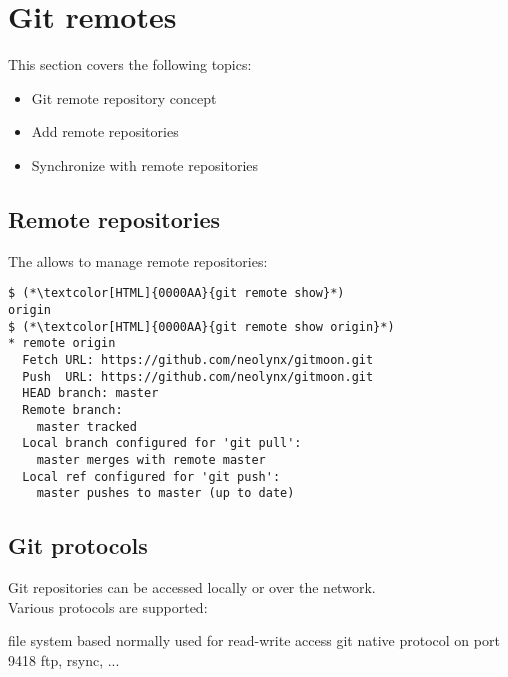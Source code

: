 \section{Git remotes}
\begin{frame}[fragile]
  \slidetitle
  This section covers the following topics:
  \begin{itemize}
    \pause
    \item Git remote repository concept
    \pause
    \item Add remote repositories
    \pause
    \item Synchronize with remote repositories
  \end{itemize}
\end{frame}

\subsection{Remote repositories}
\begin{frame}[fragile]
  \subslidetitle
  The  allows to manage remote repositories:
  \begin{lstlisting}
$ (*\textcolor[HTML]{0000AA}{git remote show}*)
origin
$ (*\textcolor[HTML]{0000AA}{git remote show origin}*)
* remote origin
  Fetch URL: https://github.com/neolynx/gitmoon.git
  Push  URL: https://github.com/neolynx/gitmoon.git
  HEAD branch: master
  Remote branch:
    master tracked
  Local branch configured for 'git pull':
    master merges with remote master
  Local ref configured for 'git push':
    master pushes to master (up to date)
\end{lstlisting}
\end{frame}

\subsection{Git protocols}
\begin{frame}[fragile]
  \subslidetitle
  Git repositories can be accessed locally or over the network.
  \\
  \vspace{1em}
  Various protocols are supported:
  \begin{itemize}
    {file system based}
      {normally used for read-write access}
      {git native protocol on port 9418}
   {ftp, rsync, ...}
  \end{itemize}
\end{frame}

